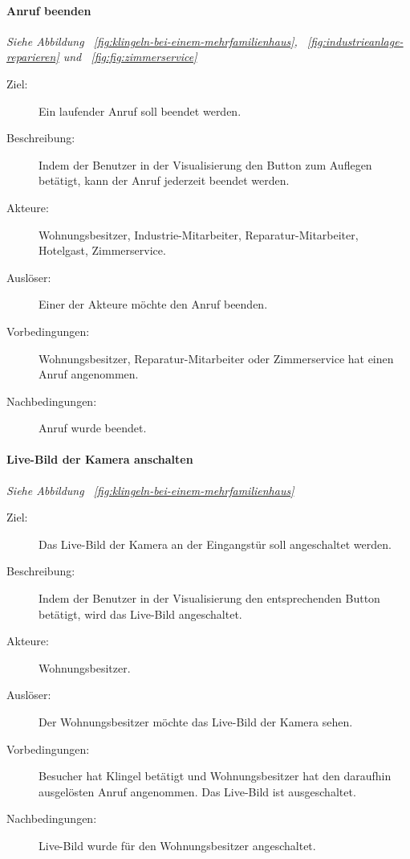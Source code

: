 \paragraph{\large{Anruf beenden}}
\textit{Siehe Abbildung ~\ref{fig:klingeln-bei-einem-mehrfamilienhaus}, ~\ref{fig:industrieanlage-reparieren} und ~\ref{fig:fig:zimmerservice}}
    \begin{description}
        \item[Ziel:] Ein laufender Anruf soll beendet werden.
        \item[Beschreibung:] Indem der Benutzer in der Visualisierung den Button zum Auflegen betätigt, kann der Anruf jederzeit beendet werden.
        \item[Akteure:] Wohnungsbesitzer, Industrie-Mitarbeiter, Reparatur-Mitarbeiter, Hotelgast, Zimmerservice.
        \item[Auslöser:] Einer der Akteure möchte den Anruf beenden.
        \item[Vorbedingungen:] Wohnungsbesitzer, Reparatur-Mitarbeiter oder Zimmerservice hat einen Anruf angenommen.
        \item[Nachbedingungen:] Anruf wurde beendet.
    \end{description}
    
\paragraph{\large{Live-Bild der Kamera anschalten}}
\textit{Siehe Abbildung ~\ref{fig:klingeln-bei-einem-mehrfamilienhaus}}
    \begin{description}
        \item[Ziel:] Das Live-Bild der Kamera an der Eingangstür soll angeschaltet werden.
        \item[Beschreibung:] Indem der Benutzer in der Visualisierung den entsprechenden Button betätigt, wird das Live-Bild angeschaltet.
        \item[Akteure:] Wohnungsbesitzer.
        \item[Auslöser:] Der Wohnungsbesitzer möchte das Live-Bild der Kamera sehen.
        \item[Vorbedingungen:] Besucher hat Klingel betätigt und Wohnungsbesitzer hat den daraufhin ausgelösten Anruf angenommen.
            Das Live-Bild ist ausgeschaltet.
        \item[Nachbedingungen:] Live-Bild wurde für den Wohnungsbesitzer angeschaltet.
    \end{description}

